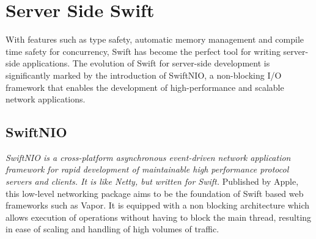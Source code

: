 \chapter{Server Side Swift}
With features such as type safety, automatic memory management and compile time safety for concurrency, Swift has become the perfect tool for writing server-side applications. 
The evolution of Swift for server-side development is significantly marked by the introduction of SwiftNIO, a non-blocking I/O framework that enables the development of high-performance and scalable network applications. 

\section{SwiftNIO}
\textit{SwiftNIO is a cross-platform asynchronous event-driven network application framework for rapid development of maintainable high performance protocol servers and clients.
It is like Netty, but written for Swift.}\cite{open-source-apple}
Published by Apple, this low-level networking package aims to be the foundation of Swift based web frameworks such as Vapor. It is equipped with a non blocking architecture which allows execution of operations without having to block the main thread, resulting in ease of scaling and handling of high volumes of traffic.

